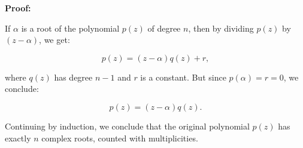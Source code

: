 \textbf{Proof:}

If \(\alpha\) is a root of the polynomial \(p(z)\) of degree \(n\), then by dividing 
\(p(z)\) by \((z - \alpha)\), we get:

\[
	p(z) = (z - \alpha) q(z) + r,
\]

where \(q(z)\) has degree \(n - 1\) and \(r\) is a constant. But since \(p(\alpha) = r = 0\), we conclude:

\[
	p(z) = (z - \alpha) q(z).
\]

Continuing by induction, we conclude that the original polynomial \(p(z)\) has exactly \(n\) 
complex roots, counted with multiplicities.

\QED
